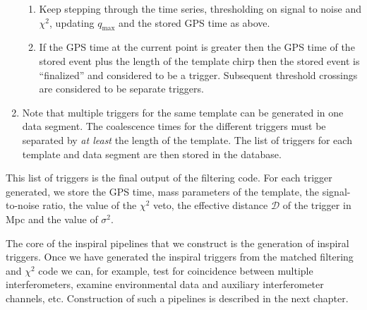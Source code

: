 \begin{enumerate}
\begin{enumerate}
\item Keep stepping through the time series, thresholding on signal to noise
and $\chi^2$, updating $q_{\mathrm{max}}$ and the stored GPS time as above.

\item If the GPS time at the current point is greater then the GPS time of the
stored event plus the length of the template chirp then the stored event is
``finalized'' and considered to be a trigger. Subsequent threshold crossings are
considered to be separate triggers.
\end{enumerate}

\item Note that multiple triggers for the same template can be generated in
one data segment. The coalescence times for the different triggers must be
separated by \textit{at least} the length of the template.  The list of
triggers for each template and data segment are then stored in the database. 
\end{enumerate}

This list of triggers is the final output of the filtering code. For each
trigger generated, we store the GPS time, mass parameters of the template,
the signal-to-noise ratio, the value of the $\chi^2$ veto, the effective
distance $\mathcal{D}$ of the trigger in Mpc and the value of $\sigma^2$.

The core of the inspiral pipelines that we construct is the generation of
inspiral triggers. Once we have generated the inspiral triggers from the
matched filtering and $\chi^2$ code we can, for example, test for coincidence
between multiple interferometers, examine environmental data and auxiliary
interferometer channels, etc. Construction of such a pipelines is described in
the next chapter.


